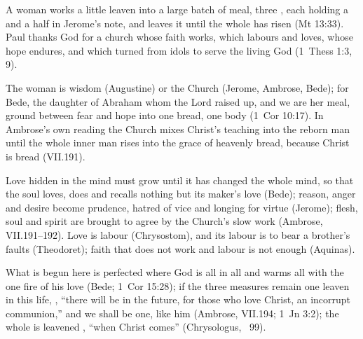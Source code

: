 \begin{fourSenses}
\item[Literal.] A woman works a little leaven into a large batch of meal,
three , each holding a  and a half in Jerome's
note, and leaves it until the whole has risen (Mt 13:33). Paul thanks God for
a church whose faith works, which labours and loves, whose hope endures, and
which turned from idols to serve the living God (1~Thess 1:3, 9).
\item[Allegorical.] The woman is wisdom (Augustine) or the Church (Jerome,
Ambrose, Bede); for Bede, the daughter of Abraham whom the Lord raised up, and
we are her meal, ground between fear and hope into one bread, one body
(1~Cor 10:17). In Ambrose's own reading the Church mixes Christ's teaching
into the reborn man until the whole inner man rises into the grace of
heavenly bread, because Christ is bread (VII.191).
\item[Moral.] Love hidden in the mind must grow until it has changed the whole
mind, so that the soul loves, does and recalls nothing but its maker's love
(Bede); reason, anger and desire become prudence, hatred of vice and longing
for virtue (Jerome); flesh, soul and spirit are brought to agree by the
Church's slow work (Ambrose, VII.191--192). Love is labour (Chrysostom), and
its labour is to bear a brother's faults (Theodoret); faith that does not work
and labour is not enough (Aquinas).
\item[Anagogical.] What is begun here is perfected where God is all in all
and warms all with the one fire of his love (Bede; 1~Cor 15:28); if the three
measures remain one leaven in this life, , ``there will be in the future, for those who
love Christ, an incorrupt communion,'' and we shall be one, like him
(Ambrose, VII.194; 1~Jn 3:2); the whole is leavened , ``when Christ comes'' (Chrysologus, ~99).
\end{fourSenses}
